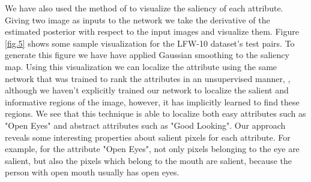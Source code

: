 We have also used the method of \cite{saliency} to visualize the saliency of each attribute. Giving two image as inputs to the network we take the derivative of the estimated posterior with respect to the input images and visualize them. Figure \ref{fig.5} shows some sample visualization for the LFW-10 dataset's test pairs. To generate this figure we have have applied Gaussian smoothing to the saliency map.
Using this visualization we can localize the attribute using the same network that was trained to rank the attributes in an unsupervised manner, \ie, although we haven't explicitly trained our network to localize the salient and informative regions of the image, however, it has implicitly learned to find these regions. We see that this technique is able to localize both easy attributes such as "Open Eyes" and abstract attributes such as "Good Looking". Our approach reveals some interesting properties about salient pixels for each attribute. For example, for the attribute "Open Eyes", not only pixels belonging to the eye are salient, but also the pixels which belong to the mouth are salient, because the person with open mouth usually has open eyes.

